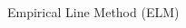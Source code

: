 \documentclass[mathserif]{beamer}
\begin{document}
\begin{frame}{}
\begin{columns}[t]
\begin{column}{.3\linewidth}
\begin{block}{Empirical Line Method (ELM)}






\vspace{-.5cm}
\end{block}

\end{column}   

 \begin{column}{.3\linewidth}  %


\end{column}
\end{columns}
\end{frame}
\end{document}
